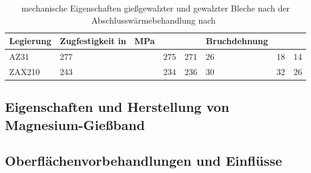 \begin{table}
    \centering
    \begin{tabular}{| l | l | l | l | l | l | l |}
        \hline
        Legierung & \textbf{Zugfestigkeit in \SI{}{\MPa}} & & & \textbf{Bruchdehnung} & & \\
        \hline
        AZ31 & 277 & 275 & 271 & 26 & 18 & 14 \\
        \hline
        ZAX210 & 243 & 234 & 236 & 30 & 32 & 26 \\
        \hline
    \end{tabular}
    \caption{mechanische Eigenschaften gießgewalzter und gewalzter Bleche nach der Abschlusswärmebehandlung nach~\cite{Ullmann2019}}
    \label{tab:}
\end{table}


\subsection{Eigenschaften und Herstellung von Magnesium-Gießband}\label{subsec:eigherstellungmgband}

\subsection{Oberflächenvorbehandlungen und Einflüsse}\label{subsec:oberflächen}



